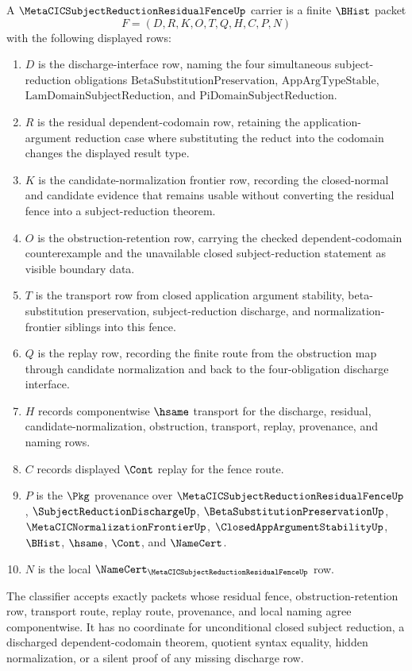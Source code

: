 \begin{definition}
\label{def:metacic-subject-reduction-residual-fence-carrier}
A $\MetaCICSubjectReductionResidualFenceUp$ carrier is a finite $\BHist$ packet
$$
F=(D,R,K,O,T,Q,H,C,P,N)
$$
with the following displayed rows:
\begin{enumerate}
\item $D$ is the discharge-interface row, naming the four simultaneous subject-reduction obligations $\mathrm{BetaSubstitutionPreservation}$, $\mathrm{AppArgTypeStable}$, $\mathrm{LamDomainSubjectReduction}$, and $\mathrm{PiDomainSubjectReduction}$.
\item $R$ is the residual dependent-codomain row, retaining the application-argument reduction case where substituting the reduct into the codomain changes the displayed result type.
\item $K$ is the candidate-normalization frontier row, recording the closed-normal and candidate evidence that remains usable without converting the residual fence into a subject-reduction theorem.
\item $O$ is the obstruction-retention row, carrying the checked dependent-codomain counterexample and the unavailable closed subject-reduction statement as visible boundary data.
\item $T$ is the transport row from closed application argument stability, beta-substitution preservation, subject-reduction discharge, and normalization-frontier siblings into this fence.
\item $Q$ is the replay row, recording the finite route from the obstruction map through candidate normalization and back to the four-obligation discharge interface.
\item $H$ records componentwise $\hsame$ transport for the discharge, residual, candidate-normalization, obstruction, transport, replay, provenance, and naming rows.
\item $C$ records displayed $\Cont$ replay for the fence route.
\item $P$ is the $\Pkg$ provenance over $\MetaCICSubjectReductionResidualFenceUp$, $\SubjectReductionDischargeUp$, $\BetaSubstitutionPreservationUp$, $\MetaCICNormalizationFrontierUp$, $\ClosedAppArgumentStabilityUp$, $\BHist$, $\hsame$, $\Cont$, and $\NameCert$.
\item $N$ is the local $\NameCert_{\MetaCICSubjectReductionResidualFenceUp}$ row.
\end{enumerate}
The classifier accepts exactly packets whose residual fence, obstruction-retention row, transport route, replay route, provenance, and local naming agree componentwise. It has no coordinate for unconditional closed subject reduction, a discharged dependent-codomain theorem, quotient syntax equality, hidden normalization, or a silent proof of any missing discharge row.
\end{definition}


